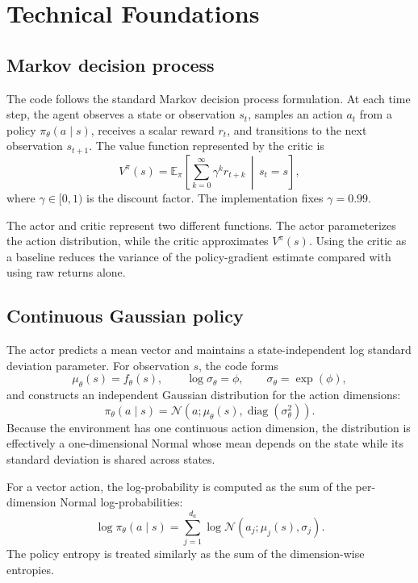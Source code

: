 \documentclass[11pt,a4paper]{article}
\begin{document}
\section{Technical Foundations}
\subsection{Markov decision process}
The code follows the standard Markov decision process formulation. At each time step, the agent observes a state or observation $s_t$, samples an action $a_t$ from a policy $\pi_\theta(a\mid s)$, receives a scalar reward $r_t$, and transitions to the next observation $s_{t+1}$. The value function represented by the critic is
\begin{equation}
V^\pi(s) = \mathbb{E}_\pi\left[\sum_{k=0}^{\infty} \gamma^k r_{t+k}\,\middle|\,s_t=s\right],
\end{equation}
where $\gamma\in[0,1)$ is the discount factor. The implementation fixes $\gamma=0.99$.

The actor and critic represent two different functions. The actor parameterizes the action distribution, while the critic approximates $V^\pi(s)$. Using the critic as a baseline reduces the variance of the policy-gradient estimate compared with using raw returns alone.

\subsection{Continuous Gaussian policy}
The actor predicts a mean vector and maintains a state-independent log standard deviation parameter. For observation $s$, the code forms
\begin{equation}
\mu_\theta(s) = f_\theta(s),
\qquad
\log\sigma_\theta = \phi,
\qquad
\sigma_\theta = \exp(\phi),
\end{equation}
and constructs an independent Gaussian distribution for the action dimensions:
\begin{equation}
\pi_\theta(a\mid s) = \mathcal{N}\!\left(a;\mu_\theta(s),\operatorname{diag}(\sigma_\theta^2)\right).
\end{equation}
Because the environment has one continuous action dimension, the distribution is effectively a one-dimensional Normal whose mean depends on the state while its standard deviation is shared across states.

For a vector action, the log-probability is computed as the sum of the per-dimension Normal log-probabilities:
\begin{equation}
\log\pi_\theta(a\mid s)
= \sum_{j=1}^{d_a}\log\mathcal{N}(a_j;\mu_j(s),\sigma_j).
\end{equation}
The policy entropy is treated similarly as the sum of the dimension-wise entropies.
\end{document}
